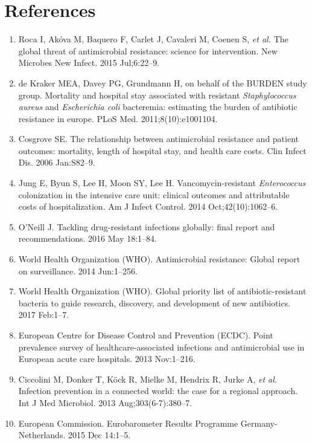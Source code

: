 \documentclass[
]{book}
\providecommand{\tightlist}{%
  \setlength{\itemsep}{0pt}\setlength{\parskip}{0pt}}
\begin{document}
\hypertarget{references-9}{%
\section*{References}\label{references-9}}

\begin{enumerate}
\def\labelenumi{\arabic{enumi}.}
\tightlist
\item
  Roca I, Akóva M, Baquero F, Carlet J, Cavaleri M, Coenen S, \emph{et al.} The global threat of antimicrobial resistance: science for intervention. New Microbes New Infect. 2015 Jul;6:22--9.
\item
  de Kraker MEA, Davey PG, Grundmann H, on behalf of the BURDEN study group. Mortality and hospital stay associated with resistant \emph{Staphylococcus aureus} and \emph{Escherichia coli} bacteremia: estimating the burden of antibiotic resistance in europe. PLoS Med. 2011;8(10):e1001104.
\item
  Cosgrove SE. The relationship between antimicrobial resistance and patient outcomes: mortality, length of hospital stay, and health care costs. Clin Infect Dis. 2006 Jan:S82--9.
\item
  Jung E, Byun S, Lee H, Moon SY, Lee H. Vancomycin-resistant \emph{Enterococcus} colonization in the intensive care unit: clinical outcomes and attributable costs of hospitalization. Am J Infect Control. 2014 Oct;42(10):1062--6.
\item
  O'Neill J. Tackling drug-resistant infections globally: final report and recommendations. 2016 May 18:1--84.
\item
  World Health Organization (WHO). Antimicrobial resistance: Global report on surveillance. 2014 Jun:1--256.
\item
  World Health Organization (WHO). Global priority list of antibiotic-resistant bacteria to guide research, discovery, and development of new antibiotics. 2017 Feb:1--7.
\item
  European Centre for Disease Control and Prevention (ECDC). Point prevalence survey of healthcare-associated infections and antimicrobial use in European acute care hospitals. 2013 Nov:1--216.
\item
  Ciccolini M, Donker T, Köck R, Mielke M, Hendrix R, Jurke A, \emph{et al.} Infection prevention in a connected world: the case for a regional approach. Int J Med Microbiol. 2013 Aug;303(6-7):380--7.
\item
  European Commission. Eurobarometer Results Programme Germany-Netherlands. 2015 Dec 14:1--5.

\end{enumerate}
\end{document}
